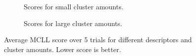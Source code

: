 \begin{figure}[ht]
    \centering
    \begin{subfigure}{.45\textwidth}
        \centering
        \captionsetup{width=0.9\linewidth}
        \captionsetup{justification=centering}
        \caption{Scores for small cluster amounts.}
    \end{subfigure}
    \hspace{1cm}
    \begin{subfigure}{.45\textwidth}
        \centering
        \captionsetup{width=0.9\linewidth}
        \captionsetup{justification=centering}
        \caption{Scores for large cluster amounts.}
    \end{subfigure}
    \captionsetup{width=0.8\linewidth}
    \captionsetup{justification=centering}
    \caption{Average MCLL score over 5 trials for different descriptors and cluster amounts. Lower score is better.}
    \label{fig:2-input}
\end{figure}


